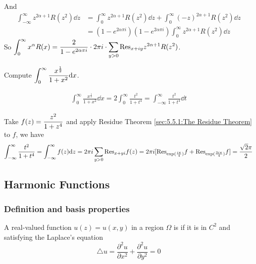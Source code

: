 
And 
\begin{equation*}
    \begin{aligned}
        \int_{-\infty}^\infty z^{2\alpha+1}R(z^2)\dd z&=\int_0^\infty z^{2\alpha+1}R(z^2)\dd z+\int_0^\infty(-z)^{2\alpha+1}R(z^2)\dd z\\
        &=(1-e^{2\alpha\pi i})(1-e^{2\alpha\pi i})\int_0^\infty z^{2\alpha+1}R(z^2)\dd z
    \end{aligned}
\end{equation*}
So  $ \displaystyle\int_0^\infty x^\alpha R(x)=\frac{2}{1-e^{2\alpha \pi i}}\cdot 2\pi i\cdot\sum_{y>0}\mathrm{Res}_{x+iy}z^{2\alpha+1}R(z^2) $.

\begin{example}
    Compute  $ \displaystyle\int_0^\infty\frac{x^{\frac{1}{2}}}{1+x^2}\mathrm{d} x $.
    
    
\begin{equation*}
    \begin{aligned}
        \int_0^\infty\frac{x^{\frac{1}{2}}}{1+x^2}\dd x=2\int_0^\infty\frac{t^2}{1+t^4}=\int_{-\infty}^\infty\frac{t^2}{1+t^4}\dd t
    \end{aligned}
\end{equation*}

Take  $ f(z)=\displaystyle\frac{z^2}{1+z^4} $ and apply Residue Theorem \ref{sec:5.5.1:The Residue Theorem} to  $ f $, we have 
\[\int_{-\infty}^\infty \frac{t^2}{1+t^4}=\int_{-\infty}^\infty f(z)\mathrm{d} z=2\pi i \sum_{y>0}\mathrm{Res}_{x+yi}f(z)=2\pi i[\mathrm{Res}_{\exp(\frac{i\pi   }{4})}f+\mathrm{Res}_{\exp(\frac{3i\pi}{4})}f]=\frac{\sqrt{2}\pi }{2}\] 
\end{example}

\subsection{Harmonic Functions}
\subsubsection{Definition and basis  properties}

A real-valued function  $ u(z)=u(x,y) $  in a region  $ \Omega  $ is  if it is in $ C^2 $ and satisfying the Laplace's equation
\begin{equation}
    \triangle u=\frac{\partial^2 u }{\partial x^2}+\frac{\partial^2 u}{\partial y^2}=0\label{Laplace's equation}
\end{equation}

